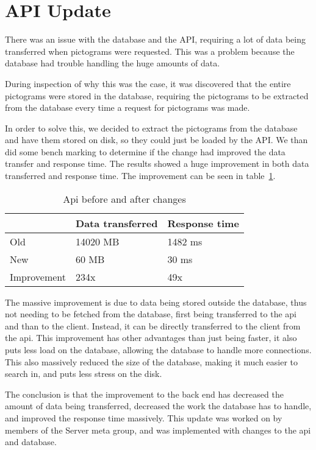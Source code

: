 \section{API Update}
There was an issue with the database and the API, requiring a lot of data being transferred when pictograms were requested. This was a problem because the database had trouble handling the huge amounts of data. 

During inspection of why this was the case, it was discovered that the entire pictograms were stored in the database, requiring the pictograms to be extracted from the database every time a request for pictograms was made. 

In order to solve this, we decided to extract the pictograms from the database and have them stored on disk, so they could just be loaded by the API. We than did some bench marking to determine if the change had improved the data transfer and response time. The results showed a huge improvement in both data transferred and response time. The improvement can be seen in table~\ref{tab:newApi}.

\begin{table}[H]
    \centering
    \begin{tabular}{|l|l|l|}
    \hline
                    & Data transferred   & Response time \\ \hline
        Old         & 14020 MB          & 1482 ms       \\ \hline 
        New         & 60 MB             & 30 ms         \\ \hline
        Improvement & 234x              & 49x           \\ \hline
    \end{tabular}
    \caption{Api before and after changes}
    \label{tab:newApi}
\end{table}

The massive improvement is due to data being stored outside the database, thus not needing to be fetched from the database, first being transferred to the api and than to the client. Instead, it can be directly transferred to the client from the api. This improvement has other advantages than just being faster, it also puts less load on the database, allowing the database to handle more connections. This also massively reduced the size of the database, making it much easier to search in, and puts less stress on the disk.

The conclusion is that the improvement to the back end has decreased the amount of data being transferred, decreased the work the database has to handle, and improved the response time massively. This update was worked on by members of the Server meta group, and was implemented with changes to the api and database. 